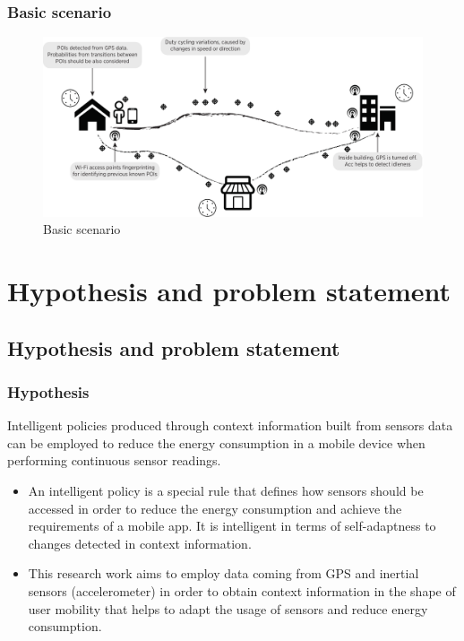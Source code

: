 \documentclass[compress,9pt,xcolor={dvipsnames,table}]{beamer}
\begin{document}
\begin{frame}\frametitle{Basic scenario}
\begin{figure}[tb]
  \centering
  \includegraphics[width=\textwidth]{../../../resources/images/vectors/scenario}
  \caption{Basic scenario}
  \label{fig:scenario}
\end{figure}
\end{frame}

\section{Hypothesis and problem statement}
\subsection{Hypothesis and problem statement}
\begin{frame}\frametitle{Hypothesis}
\begin{tcolorbox}[title=Hypothesis,colframe=PineGreen]
Intelligent policies produced through context information built from sensors data can be employed to reduce the energy consumption in a mobile device when performing continuous sensor readings.
\end{tcolorbox}

{
\small
\begin{itemize}
	\item An intelligent policy is a special rule that defines how sensors should be accessed in order to reduce the energy consumption and achieve the requirements of a mobile app.
	It is intelligent in terms of self-adaptness to changes detected in context information.
	\item This research work aims to employ data coming from GPS and inertial sensors (accelerometer) in order to obtain context information in the shape of user mobility that helps to adapt the usage of sensors and reduce energy consumption.
\end{itemize}
}
\end{frame}
\end{document}
